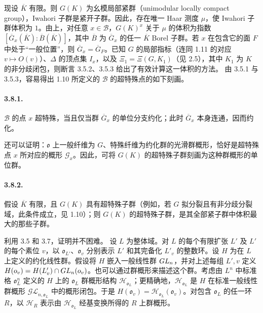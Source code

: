 现设 $\overline K$ 有限。则 $G(K)$ 为幺模局部紧群（unimodular locally compact group），Iwahori 子群是紧开子群。因此，存在唯一 Haar 测度 $\mu$，使 Iwahori 子群体积为 $1$。由上，对任意 $x\in\mathscr B$，$G(K)^x$ 关于 $\mu$ 的体积为指数 $[\overline G_x(\overline K):\overline B(\overline K)]$，其中 $\overline B$ 为 $\overline G_x$ 的任一 $\overline K$ Borel 子群。若 $x$ 在包含它的面 $F$ 中处于“一般位置”，则 $\overline G_x=\overline G_F$。已知 $G$ 的局部指标（连同 1.11 的对应 $v\mapsto O(v)$）、$\Delta$ 的顶点集 $I_x$，以及 $\Xi_1=\Xi(G,K_1)$（见 2.5），其中 $K_1$ 为 $K$ 的非分歧闭包，则断言 3.5.2、3.5.3 给出了有效计算这一体积的方法。
由 3.5.1 与 3.5.3，容易得出 1.10 所定义的 $\mathscr B$ 的超特殊点的如下刻画。

\paragraph*{3.8.1.}$\mathscr B$ 的点 $x$ 超特殊，当且仅当群 $\overline G_x$ 的单位分支约化；此时 $\overline G_x$ 本身连通，因而约化。

还可以证明：$\mathfrak o$ 上一般纤维为 $G$、特殊纤维为约化群的光滑群概形，恰好是超特殊点 $x$ 所对应的概形 $\mathscr G_x$。因此，可将 $G(K)$ 的超特殊子群刻画为这种群概形的单位群。

\paragraph*{3.8.2.}假设 $\overline K$ 有限，且 $G(K)$ 具有超特殊子群（例如，若 $G$ 拟分裂且有非分歧分裂域，此条件成立，见 1.10）；则 $G(K)$ 的超特殊子群，是其全部紧子群中体积最大的那些子群。

利用 3.5 和 3.7，证明并不困难。
设 $L$ 为整体域。对 $L$ 的每个有限扩张 $L'$ 及 $L'$ 的每个素位 $v$，以 $\mathfrak o_{L'}$、$\mathfrak o_v$ 分别表示 $L'$ 和其完备化 $L'_v$ 的整数环。设 $H$ 为在 $L$ 上定义的约化线性群。假设将 $H$ 嵌入一般线性群 $GL_n$，并对上述每组 $L',v$ 定义 $H(o_v)=H(L'_v)\cap GL_n(o_v)$。也可以通过群概形来描述这个群。考虑由 $L^n$ 中标准格 $\mathfrak o_L^n$ 定义的 $H$ 上的 $\mathfrak o_L$ 群概形结构 $\mathscr H_{\mathfrak o_L}$；更精确地，$\mathscr H_{\mathfrak o_L}$ 是 $H$ 在标准一般线性群概形 $\mathscr{GL}_{n,\mathfrak o_L}$ 中的概形闭包。于是 $H(\mathfrak o_v)=\mathscr H_{\mathfrak o_L}(\mathfrak o_v)$。对包含 $\mathfrak o_L$ 的任一环 $R$，以 $\mathscr H_R$ 表示由 $\mathscr H_{\mathfrak o_L}$ 经基变换所得的 $R$ 上群概形。

